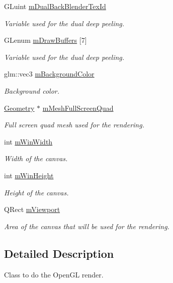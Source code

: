 \begin{DoxyCompactItemize}
G\+Luint \hyperlink{class_g_l_canvas_a5a1a479531bb816695f56bad28d3e7c8}{m\+Dual\+Back\+Blender\+Tex\+Id}
\begin{DoxyCompactList}\small\item\em Variable used for the dual deep peeling. \end{DoxyCompactList}\item 
G\+Lenum \hyperlink{class_g_l_canvas_afa09344f1201ae2c8a16c8d093ca8856}{m\+Draw\+Buffers} \mbox{[}7\mbox{]}
\begin{DoxyCompactList}\small\item\em Variable used for the dual deep peeling. \end{DoxyCompactList}\item 
glm\+::vec3 \hyperlink{class_g_l_canvas_aa51f35170aac87b378515cfecb76be6d}{m\+Background\+Color}
\begin{DoxyCompactList}\small\item\em Background color. \end{DoxyCompactList}\item 
\hyperlink{class_geometry}{Geometry} $\ast$ \hyperlink{class_g_l_canvas_a54c05eee19aa86e9619db41fc3555c5a}{m\+Mesh\+Full\+Screen\+Quad}
\begin{DoxyCompactList}\small\item\em Full screen quad mesh used for the rendering. \end{DoxyCompactList}\item 
int \hyperlink{class_g_l_canvas_aece06a3918baceaa5a7c8468f2fda76b}{m\+Win\+Width}
\begin{DoxyCompactList}\small\item\em Width of the canvas. \end{DoxyCompactList}\item 
int \hyperlink{class_g_l_canvas_ac8ccc215c8038338702c314f369910e2}{m\+Win\+Height}
\begin{DoxyCompactList}\small\item\em Height of the canvas. \end{DoxyCompactList}\item 
Q\+Rect \hyperlink{class_g_l_canvas_add002deb2b2eccb3c7f04335d5f12782}{m\+Viewport}
\begin{DoxyCompactList}\small\item\em Area of the canvas that will be used for the rendering. \end{DoxyCompactList}\end{DoxyCompactItemize}


\subsection{Detailed Description}
Class to do the Open\+G\+L render. 

